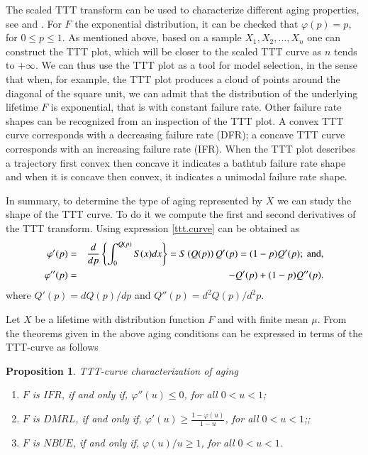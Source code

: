 \documentclass[preprint,12pt]{elsarticle}
\newtheorem{prp}{{\sc Proposition}}[section]
\newtheorem{ex}{{\sc Example}}[section]
\begin{document}
\noindent The scaled TTT transform can be used to characterize different aging properties, see \cite{BP75} and \cite{BK84}. For $F$ the exponential distribution, it can be checked that $\varphi(p)=p$, for $0 \leq p \leq 1$. As mentioned above, based on a sample $X_1,X_2,\ldots, X_n$ one can construct the TTT plot, which will be closer to the scaled TTT curve as $n$ tends to $+\infty$. We can thus use the TTT plot as a tool for model selection, in the sense that when, for example, the TTT plot produces a cloud of points around the diagonal of the square unit, we can admit that the distribution of the underlying lifetime $F$ is exponential, that is with constant failure rate. Other failure rate shapes can be recognized from an inspection of the TTT plot. A convex TTT curve corresponds with a decreasing failure rate (DFR); a concave TTT curve corresponds with an increasing failure rate (IFR). When the TTT plot describes a trajectory first convex then concave it indicates a bathtub failure rate shape and when it is concave then convex, it indicates a unimodal failure rate shape. 

In summary, to determine the type of aging represented by $X$ we can study the shape of the TTT curve. To do it we compute the first and second derivatives of the TTT transform. Using expression \eqref{ttt.curve} can be obtained as
\begin{eqnarray*}
\varphi'(p)&=& \frac{d}{d p}\left\{\int_0^{Q(p)}S(x)dx\right\}=S\left(Q(p)\right)Q'(p)=(1-p)Q'(p); \ {\rm and}, \\
\varphi''(p)&=& -Q'(p)+(1-p)Q''(p). 
\end{eqnarray*}
where $Q'(p)=dQ(p)/dp$ and $Q''(p)=d^2Q(p)/d^2p$.




Let $X$ be a lifetime with distribution function $F$ and with finite mean $\mu$. From the theorems given  in\cite{Klefsjo83} the above aging conditions can be expressed in terms of the TTT-curve as follows
\begin{prp} {TTT-curve characterization of aging} \

\begin{enumerate}
\item $ F$ is $ IFR$, if and only if, $ \varphi'' (u) \leq  0$, for all $0 <u <1$;
\item $F$ is $DMRL$, if and only if, $ \varphi'(u) \geq  \frac{1-\varphi(u)}{1-u}$, for all $0 <u <1$;;
\item $F$ is $ NBUE$, if and only if, $\varphi(u)/u \geq  1$, for all $0 <u <1$.

\end{enumerate}
 \end{prp}
\end{document}
